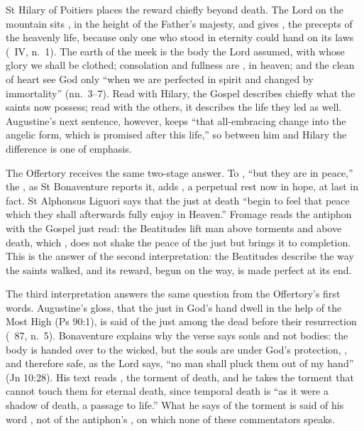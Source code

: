 St Hilary of Poitiers places the reward chiefly beyond death. The Lord on the
mountain sits , in
the height of the Father's majesty, and gives , the precepts of the heavenly life, because only one who stood in
eternity could hand on its laws (\ IV, n.~1). The earth of the
meek is the body the Lord assumed, with whose glory we shall be clothed;
consolation and fullness are , in heaven; and the clean of heart see God only ``when we
are perfected in spirit and changed by immortality'' (nn.~3--7). Read with
Hilary, the Gospel describes chiefly what the saints now possess; read with
the others, it describes the life they led as well. Augustine's next
sentence, however, keeps ``that all-embracing change into the
angelic form, which is promised after this life,'' so between him and Hilary
the difference is one of emphasis.

The Offertory receives the same two-stage answer. To , ``but they are in peace,'' the , as St Bonaventure reports
it, adds , a perpetual rest
now in hope, at last in fact. St Alphonsus Liguori says that the just at death
``begin to feel that peace which they shall afterwards fully enjoy in
Heaven.'' Fromage reads the antiphon with the Gospel just read: the
Beatitudes lift man above torments and above death, which , does not shake the peace of the just
but brings it to completion. This is the answer of the second interpretation:
the Beatitudes describe the way the saints walked, and its reward, begun on
the way, is made perfect at its end.

The third interpretation answers the same question from the Offertory's
first words. Augustine's gloss, that the just in God's hand dwell in the
help of the Most High (Ps 90:1), is said of the just among the dead before
their resurrection (\ 87, n.~5). Bonaventure explains why
the verse says souls and not bodies: the body is handed over to the wicked,
but the souls are under God's protection, , and
therefore safe, as the Lord says, ``no man shall pluck them out of my hand''
(Jn 10:28). His text reads , the torment of death, and
he takes the torment that cannot touch them for eternal death, since temporal
death is ``as it were a shadow of death, a passage to life.'' What he says of
the torment is said of his word , not of the antiphon's
, on which none of these commentators speaks.


